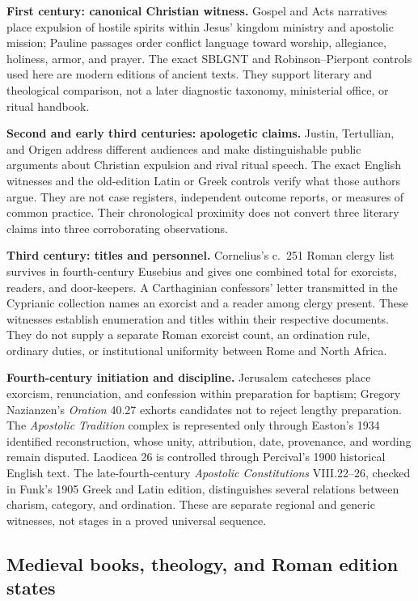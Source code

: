 \medskip\noindent\textbf{First century: canonical Christian witness.}
Gospel and Acts narratives place expulsion of hostile spirits within Jesus'
kingdom ministry and apostolic mission; Pauline passages order conflict
language toward worship, allegiance, holiness, armor, and prayer. The exact
SBLGNT and Robinson--Pierpont controls used here are modern editions of
ancient texts. They support literary and theological comparison, not a later
diagnostic taxonomy, ministerial office, or ritual handbook.

\medskip\noindent\textbf{Second and early third centuries: apologetic
claims.}
Justin, Tertullian, and Origen address different audiences and make
distinguishable public arguments about Christian expulsion and rival ritual
speech. The exact English witnesses and the old-edition Latin or Greek
controls verify what those authors argue. They are not case registers,
independent outcome reports, or measures of common practice. Their
chronological proximity does not convert three literary claims into three
corroborating observations.

\medskip\noindent\textbf{Third century: titles and personnel.}
Cornelius's c.~251 Roman clergy list survives in fourth-century Eusebius and
gives one combined total for exorcists, readers, and door-keepers. A
Carthaginian confessors' letter transmitted in the Cyprianic collection names
an exorcist and a reader among clergy present. These witnesses establish
enumeration and titles within their respective documents. They do not supply
a separate Roman exorcist count, an ordination rule, ordinary duties, or
institutional uniformity between Rome and North Africa.

\medskip\noindent\textbf{Fourth-century initiation and discipline.}
Jerusalem catecheses place exorcism, renunciation, and confession within
preparation for baptism; Gregory Nazianzen's \emph{Oration} 40.27 exhorts
candidates not to reject lengthy preparation. The \emph{Apostolic Tradition}
complex is represented only through Easton's 1934 identified reconstruction,
whose unity, attribution, date, provenance, and wording remain disputed.
Laodicea 26 is controlled through Percival's 1900 historical English text.
The late-fourth-century \emph{Apostolic Constitutions} VIII.22--26, checked in
Funk's 1905 Greek and Latin edition, distinguishes several relations between
charism, category, and ordination. These are separate regional and generic
witnesses, not stages in a proved universal sequence.

\subsection{Medieval books, theology, and Roman edition states}

